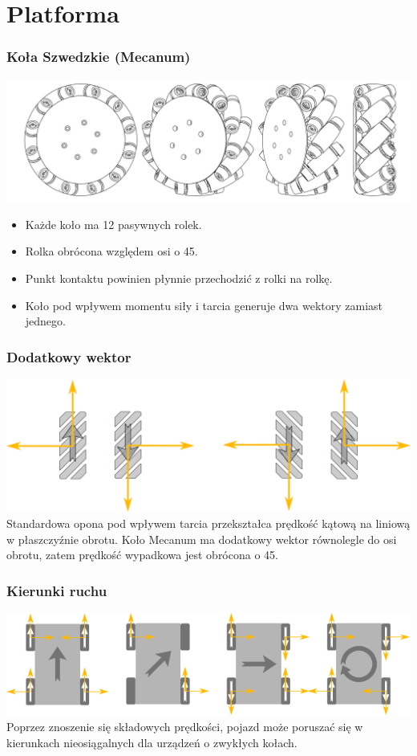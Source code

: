 \documentclass{beamer}
\begin{document}
	\section{Platforma}
	\begin{frame}
		\frametitle{Koła Szwedzkie (Mecanum)}
		\centering
		\includegraphics[width=\textwidth]{graphics/wheel.pdf}
		\begin{itemize}
			\item Każde koło ma 12 pasywnych rolek.
			\item Rolka obrócona względem osi o 45\textdegree.
			\item Punkt kontaktu powinien płynnie przechodzić z rolki na rolkę.
			\item Koło pod wpływem momentu siły i tarcia generuje dwa wektory zamiast jednego.
		\end{itemize}
	\end{frame}
	\begin{frame}
		\frametitle{Dodatkowy wektor}
		\centering
		\includegraphics[width=\textwidth]{graphics/vectors.pdf} \\
		Standardowa opona pod wpływem tarcia przekształca prędkość kątową na liniową w płaszczyźnie obrotu.
		Koło Mecanum ma dodatkowy wektor równolegle do osi obrotu, zatem prędkość wypadkowa jest obrócona o 45\textdegree.
	\end{frame}
	\begin{frame}
		\frametitle{Kierunki ruchu}
		\centering
		\includegraphics[width=\textwidth]{graphics/dirs.pdf} \\
		Poprzez znoszenie się składowych prędkości, pojazd może poruszać się w kierunkach nieosiągalnych dla urządzeń o zwykłych kołach.
	\end{frame}
\end{document}
